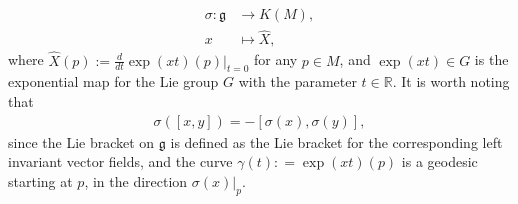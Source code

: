 \documentclass[12pt]{amsart}
\begin{document}
\begin{equation}
    \begin{split}
        \sigma: \mathfrak{g} &\rightarrow K(M), \\
                           x &\mapsto \hat{X},
    \end{split}
\end{equation}
where $\hat{X}(p) := \frac{d}{dt} \exp(x t) (p)|_{t = 0}$ for any $p\in M$, and $\exp(x t)\in G$ is the exponential map for the Lie group $G$ with the parameter $t\in \mathbb{R}$. It is worth noting that  
\begin{align}\label{relation between lie algebra and kill field}
    \sigma([x, y]) = -[\sigma(x), \sigma(y)], 
\end{align}
since the Lie bracket on $\mathfrak{g}$ is defined as the Lie bracket for the corresponding left invariant vector fields, and the curve $\gamma(t): =\exp(xt)(p)$ is a geodesic starting at $p$, in the direction $\sigma(x)|_{p}$. 
\end{document}
